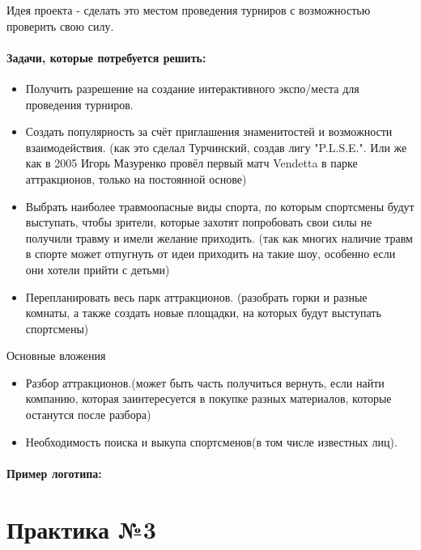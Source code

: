 \documentclass[a4paper, 12pt]{article}
\begin{document}
	Идея проекта - сделать это местом проведения турниров с возможностью проверить свою силу. 
	
	\subsection*{Задачи, которые потребуется решить:}
	\begin{itemize}
		\item Получить разрешение на создание интерактивного экспо/места для проведения турниров.
		\item Создать популярность за счёт приглашения знаменитостей и возможности взаимодействия. (как это сделал Турчинский, создав лигу "P.L.S.E.". Или же как в 2005 Игорь Мазуренко провёл первый матч Vendetta в парке аттракционов, только на постоянной основе)
		\item Выбрать наиболее травмоопасные виды спорта, по которым спортсмены будут выступать, чтобы зрители, которые захотят попробовать свои силы не получили травму и имели желание приходить. (так как многих наличие травм в спорте может отпугнуть от идеи приходить на такие шоу, особенно если они хотели прийти с детьми)
		\item Перепланировать весь парк аттракционов. (разобрать горки и разные комнаты, а также создать новые площадки, на которых будут выступать спортсмены)
	\end{itemize}

	Основные вложения
	\begin{itemize}
		\item Разбор аттракционов.(может быть часть получиться вернуть, если найти компанию, которая заинтересуется в покупке разных материалов, которые останутся после разбора)
		\item Необходимость поиска и выкупа спортсменов(в том числе известных лиц). 
	\end{itemize}

	\subsection*{Пример логотипа:}
	
	\part*{Практика №3}
\end{document}
